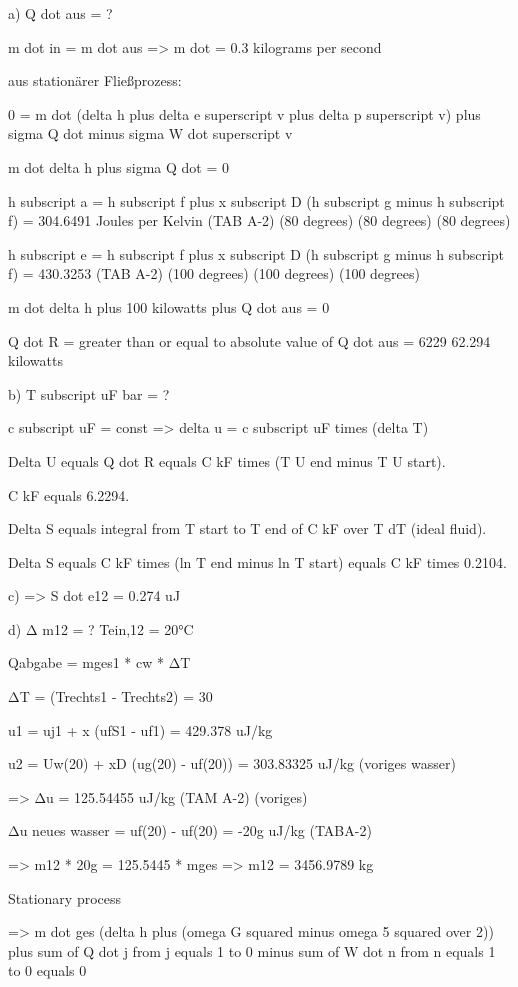 a) Q dot aus = ?

m dot in = m dot aus => m dot = 0.3 kilograms per second

aus stationärer Fließprozess:

0 = m dot (delta h plus delta e superscript v plus delta p superscript v) plus sigma Q dot minus sigma W dot superscript v

m dot delta h plus sigma Q dot = 0

h subscript a = h subscript f plus x subscript D (h subscript g minus h subscript f) = 304.6491 Joules per Kelvin (TAB A-2) (80 degrees) (80 degrees) (80 degrees)

h subscript e = h subscript f plus x subscript D (h subscript g minus h subscript f) = 430.3253 (TAB A-2) (100 degrees) (100 degrees) (100 degrees)

m dot delta h plus 100 kilowatts plus Q dot aus = 0

Q dot R = greater than or equal to absolute value of Q dot aus = 6229 62.294 kilowatts

b) T subscript uF bar = ?

c subscript uF = const => delta u = c subscript uF times (delta T)

Delta U equals Q dot R equals C kF times (T U end minus T U start).

C kF equals 6.2294.

Delta S equals integral from T start to T end of C kF over T dT (ideal fluid).

Delta S equals C kF times (ln T end minus ln T start) equals C kF times 0.2104.

c) => S dot e12 = 0.274 uJ

d) Δ m12 = ?  
Tein,12 = 20°C

Qabgabe = mges1 * cw * ΔT

ΔT = (Trechts1 - Trechts2) = 30

u1 = uj1 + x (ufS1 - uf1) = 429.378 uJ/kg

u2 = Uw(20) + xD (ug(20) - uf(20)) = 303.83325 uJ/kg  
(voriges wasser)

=> Δu = 125.54455 uJ/kg (TAM A-2)  
(voriges)

Δu neues wasser = uf(20) - uf(20) = -20g uJ/kg (TABA-2)

=> m12 * 20g = 125.5445 * mges  
=> m12 = 3456.9789 kg

Stationary process

=> m dot ges (delta h plus (omega G squared minus omega 5 squared over 2)) plus sum of Q dot j from j equals 1 to 0 minus sum of W dot n from n equals 1 to 0 equals 0

